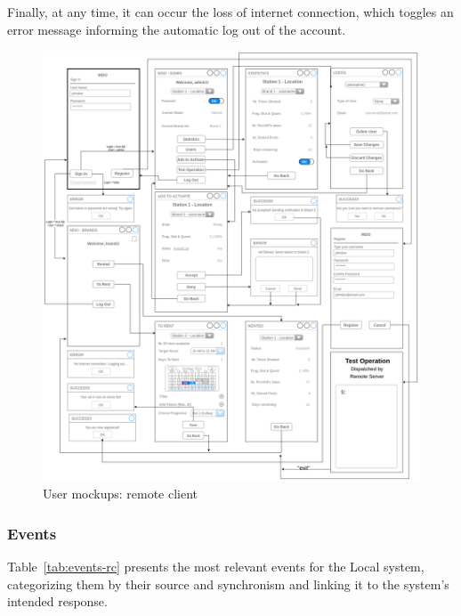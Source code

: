 Finally, at any time, it can occur the loss of internet connection, which toggles an error message informing the automatic log out of the account.
\begin{figure}[htb!]
\centering
    \includegraphics[width=0.9\columnwidth]{./img/user-mockups-rc.png}
  \caption{User mockups: remote client}%
\label{fig:user-mockups-rc}
\end{figure}

\subsubsection{Events}
\label{sec:events-1}
Table~\ref{tab:events-rc} presents the most relevant events for the Local system, categorizing them by their source and
synchronism and linking it to the system’s intended response.

